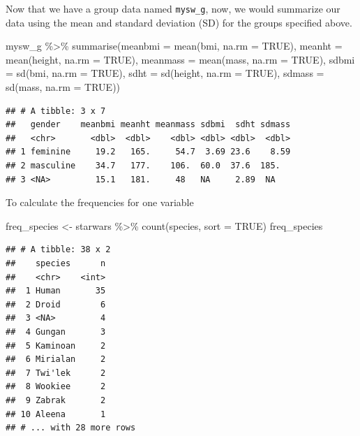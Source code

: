 \documentclass[
]{book}
\makeatletter
\newenvironment{Shaded}{\begin{snugshade}}{\end{snugshade}}
\newcommand{\AttributeTok}[1]{\textcolor[rgb]{0.61,0.61,0.61}{#1}}
\newcommand{\ConstantTok}[1]{\textcolor[rgb]{0,0,0}{#1}}
\newcommand{\FunctionTok}[1]{\textcolor[rgb]{0,0,0}{#1}}
\newcommand{\NormalTok}[1]{#1}
\newcommand{\OtherTok}[1]{\textcolor[rgb]{0.37,0.37,0.37}{#1}}
\newcommand{\SpecialCharTok}[1]{\textcolor[rgb]{0,0,0}{#1}}
\newenvironment{kframe}{%
\medskip{}
\setlength{\fboxsep}{.8em}
 \def\at@end@of@kframe{}%
 \ifinner\ifhmode%
  \def\at@end@of@kframe{\end{minipage}}%
  \begin{minipage}{\columnwidth}%
 \fi\fi%
 \def\FrameCommand##1{\hskip\@totalleftmargin \hskip-\fboxsep
 \colorbox{shadecolor}{##1}\hskip-\fboxsep
     \hskip-\linewidth \hskip-\@totalleftmargin \hskip\columnwidth}%
 \MakeFramed {\advance\hsize-\width
   \@totalleftmargin\z@ \linewidth\hsize
   \@setminipage}}%
 {\par\unskip\endMakeFramed%
 \at@end@of@kframe}
\renewenvironment{Shaded}{\begin{kframe}}{\end{kframe}}
\makeatother
\begin{document}
Now that we have a group data named \texttt{mysw\_g}, now, we would summarize our data using the mean and standard deviation (SD) for the groups specified above.

\begin{Shaded}
\begin{Highlighting}[]
\NormalTok{mysw\_g }\SpecialCharTok{\%\textgreater{}\%} \FunctionTok{summarise}\NormalTok{(}\AttributeTok{meanbmi =} \FunctionTok{mean}\NormalTok{(bmi, }\AttributeTok{na.rm =} \ConstantTok{TRUE}\NormalTok{), }
                     \AttributeTok{meanht  =} \FunctionTok{mean}\NormalTok{(height, }\AttributeTok{na.rm =} \ConstantTok{TRUE}\NormalTok{),}
                     \AttributeTok{meanmass =} \FunctionTok{mean}\NormalTok{(mass, }\AttributeTok{na.rm =} \ConstantTok{TRUE}\NormalTok{),}
                     \AttributeTok{sdbmi =} \FunctionTok{sd}\NormalTok{(bmi, }\AttributeTok{na.rm =} \ConstantTok{TRUE}\NormalTok{),}
                     \AttributeTok{sdht =} \FunctionTok{sd}\NormalTok{(height, }\AttributeTok{na.rm =} \ConstantTok{TRUE}\NormalTok{),}
                     \AttributeTok{sdmass =} \FunctionTok{sd}\NormalTok{(mass, }\AttributeTok{na.rm =} \ConstantTok{TRUE}\NormalTok{))}
\end{Highlighting}
\end{Shaded}

\begin{verbatim}
## # A tibble: 3 x 7
##   gender    meanbmi meanht meanmass sdbmi  sdht sdmass
##   <chr>       <dbl>  <dbl>    <dbl> <dbl> <dbl>  <dbl>
## 1 feminine     19.2   165.     54.7  3.69 23.6    8.59
## 2 masculine    34.7   177.    106.  60.0  37.6  185.  
## 3 <NA>         15.1   181.     48   NA     2.89  NA
\end{verbatim}

To calculate the frequencies for one variable

\begin{Shaded}
\begin{Highlighting}[]
\NormalTok{freq\_species }\OtherTok{\textless{}{-}}\NormalTok{ starwars }\SpecialCharTok{\%\textgreater{}\%} \FunctionTok{count}\NormalTok{(species, }\AttributeTok{sort =} \ConstantTok{TRUE}\NormalTok{)}
\NormalTok{freq\_species}
\end{Highlighting}
\end{Shaded}

\begin{verbatim}
## # A tibble: 38 x 2
##    species      n
##    <chr>    <int>
##  1 Human       35
##  2 Droid        6
##  3 <NA>         4
##  4 Gungan       3
##  5 Kaminoan     2
##  6 Mirialan     2
##  7 Twi'lek      2
##  8 Wookiee      2
##  9 Zabrak       2
## 10 Aleena       1
## # ... with 28 more rows
\end{verbatim}
\end{document}
